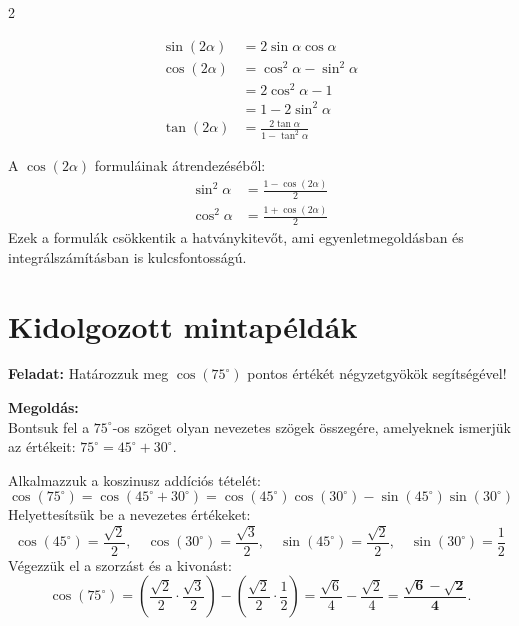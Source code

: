 \documentclass[11pt,a4paper]{article}
\begin{document}
\begin{multicols}{2}
    \begin{kiemelt}
    \begin{align*}
        \sin(2\alpha) &= 2\sin\alpha\cos\alpha \\[2mm]
        \cos(2\alpha) &= \cos^2\alpha - \sin^2\alpha \\
                      &= 2\cos^2\alpha - 1 \\
                      &= 1 - 2\sin^2\alpha \\[2mm]
        \tan(2\alpha) &= \frac{2\tan\alpha}{1 - \tan^2\alpha}
    \end{align*}
    \end{kiemelt}
    
    \columnbreak
    
    \begin{kiemelt}
    A $\cos(2\alpha)$ formuláinak átrendezéséből:
    \begin{align*}
        \sin^2\alpha &= \frac{1 - \cos(2\alpha)}{2} \\[3mm]
        \cos^2\alpha &= \frac{1 + \cos(2\alpha)}{2}
    \end{align*}
    Ezek a formulák csökkentik a hatványkitevőt, ami egyenletmegoldásban és integrálszámításban is kulcsfontosságú.
    \end{kiemelt}
\end{multicols}

\vspace{1mm}

\section{Kidolgozott mintapéldák}

\begin{pelda}
\textbf{Feladat:} Határozzuk meg $\cos(75^\circ)$ pontos értékét négyzetgyökök segítségével!

\textbf{Megoldás:}\\
Bontsuk fel a $75^\circ$-os szöget olyan nevezetes szögek összegére, amelyeknek ismerjük az értékeit:
$75^\circ = 45^\circ + 30^\circ$.

Alkalmazzuk a koszinusz addíciós tételét:
\[
\cos(75^\circ) = \cos(45^\circ + 30^\circ) = \cos(45^\circ)\cos(30^\circ) - \sin(45^\circ)\sin(30^\circ)
\]
Helyettesítsük be a nevezetes értékeket:
\[
\cos(45^\circ) = \frac{\sqrt{2}}{2}, \quad \cos(30^\circ) = \frac{\sqrt{3}}{2}, \quad \sin(45^\circ) = \frac{\sqrt{2}}{2}, \quad \sin(30^\circ) = \frac{1}{2}
\]
Végezzük el a szorzást és a kivonást:
\[
\cos(75^\circ) = \left(\frac{\sqrt{2}}{2} \cdot \frac{\sqrt{3}}{2}\right) - \left(\frac{\sqrt{2}}{2} \cdot \frac{1}{2}\right) = \frac{\sqrt{6}}{4} - \frac{\sqrt{2}}{4} = \mathbf{\frac{\sqrt{6} - \sqrt{2}}{4}}.
\]
\end{pelda}
\end{document}
